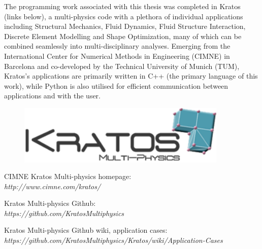 The programming work associated with this thesis was completed in Kratos (links below), a multi-physics code with a plethora of individual applications including Structural Mechanics, Fluid Dynamics, Fluid Structure Interaction, Discrete Element Modelling and Shape Optimization, many of which can be combined seamlessly into multi-disciplinary analyses. Emerging from the International Center for Numerical Methods in Engineering (CIMNE) in Barcelona and co-developed by the Technical University of Munich (TUM), Kratos's applications are primarily written in C++ (the primary language of this work), while Python is also utilised for efficient communication between applications and with the user.

\vspace*{10mm}

\begin{figure}[H]
	\centering
	\def\svgwidth{\columnwidth}
	\includegraphics[width=10cm]{images/kratoslogo.png}
	\label{kratoslogo}
\end{figure}

\begin{center}
CIMNE Kratos Multi-physics homepage: \\
\textit{http://www.cimne.com/kratos/}

Kratos Multi-physics Github: \\
\textit{https://github.com/KratosMultiphysics}

Kratos Multi-physics Github wiki, application cases: \\
 \textit{https://github.com/KratosMultiphysics/Kratos/wiki/Application-Cases}
\end{center}
